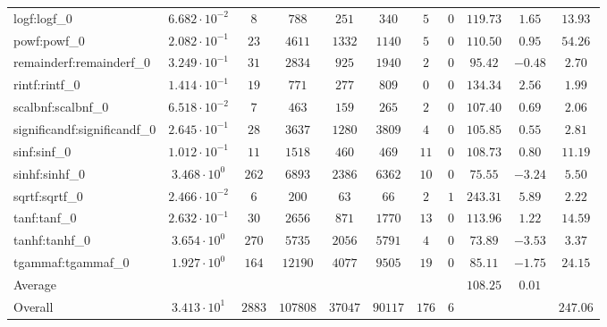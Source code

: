 \begin{tabular}{|l|c|c|c|c|c|c|c|c|c|c|}
logf:logf\_0                 & $ 6.682 \cdot 10^{-2} $ & $ 8      $ & $ 788    $ & $ 251   $ & $ 340   $ & $ 5   $ & $ 0 $ & $ 119.73      $ & $ 1.65    $ & $ 13.93   $ \\
powf:powf\_0                 & $ 2.082 \cdot 10^{-1} $ & $ 23     $ & $ 4611   $ & $ 1332  $ & $ 1140  $ & $ 5   $ & $ 0 $ & $ 110.50      $ & $ 0.95    $ & $ 54.26   $ \\
remainderf:remainderf\_0     & $ 3.249 \cdot 10^{-1} $ & $ 31     $ & $ 2834   $ & $ 925   $ & $ 1940  $ & $ 2   $ & $ 0 $ & $ 95.42       $ & $ -0.48   $ & $ 2.70    $ \\
rintf:rintf\_0               & $ 1.414 \cdot 10^{-1} $ & $ 19     $ & $ 771    $ & $ 277   $ & $ 809   $ & $ 0   $ & $ 0 $ & $ 134.34      $ & $ 2.56    $ & $ 1.99    $ \\
scalbnf:scalbnf\_0           & $ 6.518 \cdot 10^{-2} $ & $ 7      $ & $ 463    $ & $ 159   $ & $ 265   $ & $ 2   $ & $ 0 $ & $ 107.40      $ & $ 0.69    $ & $ 2.06    $ \\
significandf:significandf\_0 & $ 2.645 \cdot 10^{-1} $ & $ 28     $ & $ 3637   $ & $ 1280  $ & $ 3809  $ & $ 4   $ & $ 0 $ & $ 105.85      $ & $ 0.55    $ & $ 2.81    $ \\
sinf:sinf\_0                 & $ 1.012 \cdot 10^{-1} $ & $ 11     $ & $ 1518   $ & $ 460   $ & $ 469   $ & $ 11  $ & $ 0 $ & $ 108.73      $ & $ 0.80    $ & $ 11.19   $ \\
sinhf:sinhf\_0               & $ 3.468 \cdot 10^{0}  $ & $ 262    $ & $ 6893   $ & $ 2386  $ & $ 6362  $ & $ 10  $ & $ 0 $ & $ 75.55       $ & $ -3.24   $ & $ 5.50    $ \\
sqrtf:sqrtf\_0               & $ 2.466 \cdot 10^{-2} $ & $ 6      $ & $ 200    $ & $ 63    $ & $ 66    $ & $ 2   $ & $ 1 $ & $ 243.31      $ & $ 5.89    $ & $ 2.22    $ \\
tanf:tanf\_0                 & $ 2.632 \cdot 10^{-1} $ & $ 30     $ & $ 2656   $ & $ 871   $ & $ 1770  $ & $ 13  $ & $ 0 $ & $ 113.96      $ & $ 1.22    $ & $ 14.59   $ \\
tanhf:tanhf\_0               & $ 3.654 \cdot 10^{0}  $ & $ 270    $ & $ 5735   $ & $ 2056  $ & $ 5791  $ & $ 4   $ & $ 0 $ & $ 73.89       $ & $ -3.53   $ & $ 3.37    $ \\
tgammaf:tgammaf\_0           & $ 1.927 \cdot 10^{0}  $ & $ 164    $ & $ 12190  $ & $ 4077  $ & $ 9505  $ & $ 19  $ & $ 0 $ & $ 85.11       $ & $ -1.75   $ & $ 24.15   $ \\
\hline
Average                      & $                     $ & $        $ & $        $ & $       $ & $       $ & $     $ & $   $ & $ 108.25      $ & $ 0.01    $ & $         $ \\
\hline
Overall                      & $ 3.413 \cdot 10^{1}  $ & $ 2883   $ & $ 107808 $ & $ 37047 $ & $ 90117 $ & $ 176 $ & $ 6 $ & $             $ & $         $ & $ 247.06  $ \\
\hline
\end{tabular}
